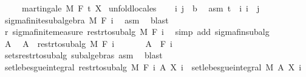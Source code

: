 \begin{isabellebody}
\ \ \ \ \ {\isachardoublequoteopen}martingale\ M\ F\ t\ X{\isachardoublequoteclose}\isanewline
%
\isadelimproof
%
\endisadelimproof
%
\isatagproof
{}\isamarkupfalse%
\ {\isacharparenleft}{\kern0pt}unfold{\isacharunderscore}{\kern0pt}locales{\isacharparenright}{\kern0pt}\isanewline
\ \ \isamarkupfalse%
\ i\ j\ {\isacharcolon}{\kern0pt}{\isacharcolon}{\kern0pt}\ {\isacharprime}{\kern0pt}b\ \isamarkupfalse%
\ asm{\isacharcolon}{\kern0pt}\ {\isachardoublequoteopen}t\ {\isasymle}\ i{\isachardoublequoteclose}\ {\isachardoublequoteopen}i\ {\isasymle}\ j{\isachardoublequoteclose}\isanewline
\ \ \isamarkupfalse%
\ sigma{\isacharunderscore}{\kern0pt}finite{\isacharunderscore}{\kern0pt}subalgebra\ M\ {\isachardoublequoteopen}F\ i{\isachardoublequoteclose}\ \isamarkupfalse%
\ asm\ \isamarkupfalse%
\ blast\isanewline
\ \ \isamarkupfalse%
\ r{\isacharcolon}{\kern0pt}\ sigma{\isacharunderscore}{\kern0pt}finite{\isacharunderscore}{\kern0pt}measure\ {\isachardoublequoteopen}restr{\isacharunderscore}{\kern0pt}to{\isacharunderscore}{\kern0pt}subalg\ M\ {\isacharparenleft}{\kern0pt}F\ i{\isacharparenright}{\kern0pt}{\isachardoublequoteclose}\ \isamarkupfalse%
\ {\isacharparenleft}{\kern0pt}simp\ add{\isacharcolon}{\kern0pt}\ sigma{\isacharunderscore}{\kern0pt}fin{\isacharunderscore}{\kern0pt}subalg{\isacharparenright}{\kern0pt}\isanewline
\ \ \isacommand{{\isacharbraceleft}{\kern0pt}}\isamarkupfalse%
\isanewline
\ \ \ \ \isamarkupfalse%
\ A\ \isamarkupfalse%
\ {\isachardoublequoteopen}A\ {\isasymin}\ restr{\isacharunderscore}{\kern0pt}to{\isacharunderscore}{\kern0pt}subalg\ M\ {\isacharparenleft}{\kern0pt}F\ i{\isacharparenright}{\kern0pt}{\isachardoublequoteclose}\isanewline
\ \ \ \ \isamarkupfalse%
\ {\isacharasterisk}{\kern0pt}{\isacharcolon}{\kern0pt}\ {\isachardoublequoteopen}A\ {\isasymin}\ F\ i{\isachardoublequoteclose}\ \isamarkupfalse%
\ sets{\isacharunderscore}{\kern0pt}restr{\isacharunderscore}{\kern0pt}to{\isacharunderscore}{\kern0pt}subalg\ subalgebras\ asm\ \isamarkupfalse%
\ blast\ \isanewline
\ \ \ \ \isamarkupfalse%
\ {\isachardoublequoteopen}set{\isacharunderscore}{\kern0pt}lebesgue{\isacharunderscore}{\kern0pt}integral\ {\isacharparenleft}{\kern0pt}restr{\isacharunderscore}{\kern0pt}to{\isacharunderscore}{\kern0pt}subalg\ M\ {\isacharparenleft}{\kern0pt}F\ i{\isacharparenright}{\kern0pt}{\isacharparenright}{\kern0pt}\ A\ {\isacharparenleft}{\kern0pt}X\ i{\isacharparenright}{\kern0pt}\ {\isacharequal}{\kern0pt}\ set{\isacharunderscore}{\kern0pt}lebesgue{\isacharunderscore}{\kern0pt}integral\ M\ A\ {\isacharparenleft}{\kern0pt}X\ i{\isacharparenright}{\kern0pt}{\isachardoublequoteclose}\ \isamarkupfalse%

\end{isabellebody}
